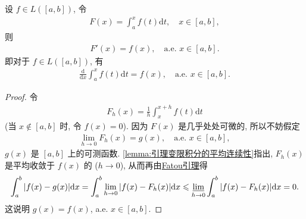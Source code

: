 \documentclass[../../main.tex]{subfiles}%
\begin{document}
\begin{theorem}
设 $f\in L([a,b])$, 令
\begin{align*}
F(x) = \int_a^x f(t)\mathrm{d}t, \quad x\in[a,b],
\end{align*}
则
\begin{align*}
F'(x) = f(x), \quad \text{a.e. } x\in[a,b].
\end{align*}
即对于 $f\in L([a,b])$, 有
\begin{align*}
\frac{\mathrm{d}}{\mathrm{d}x}\int_a^x f(t)\mathrm{d}t = f(x), \quad \text{a.e. } x\in[a,b].
\end{align*}
\end{theorem}
\begin{proof}
令
\begin{align*}
F_h(x) = \frac{1}{h}\int_x^{x+h} f(t)\mathrm{d}t
\end{align*}
(当 $x\notin [a,b]$ 时, 令 $f(x)=0$). 因为 $F(x)$ 是几乎处处可微的, 所以不妨假定
\begin{align*}
\lim_{h\to 0} F_h(x) = g(x), \quad \text{a.e. } x\in[a,b],
\end{align*}
$g(x)$ 是 $[a,b]$ 上的可测函数. \cref{lemma:引理变限积分的平均连续性}指出, $F_h(x)$ 是平均收敛于 $f(x)$ 的 ($h\to 0$), 从而再由\hyperref[theorem:Fatou引理]{Fatou引理}得
\begin{align*}
\int_a^b |f(x)-g(x)|\mathrm{d}x = \int_a^b \lim_{h\to 0} |f(x)-F_h(x)|\mathrm{d}x \leqslant \varliminf_{h\to 0} \int_a^b |f(x)-F_h(x)|\mathrm{d}x = 0.
\end{align*}
这说明 $g(x)=f(x)$, a.e. $x\in[a,b]$.
\end{proof}
\end{document}
